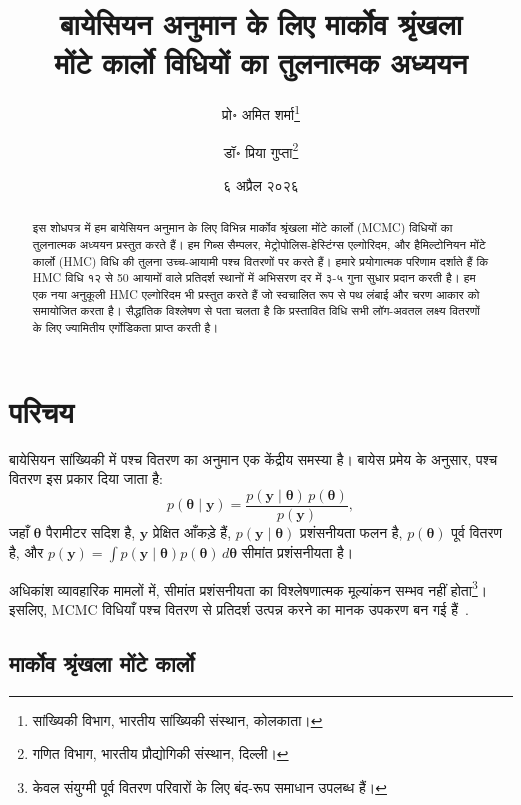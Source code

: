 \documentclass[12pt,a4paper]{article}
\title{बायेसियन अनुमान के लिए मार्कोव श्रृंखला\\
मोंटे कार्लो विधियों का तुलनात्मक अध्ययन}
\author{%
  प्रो॰ अमित शर्मा\thanks{सांख्यिकी विभाग, भारतीय सांख्यिकी संस्थान, कोलकाता।}
  \and
  डॉ॰ प्रिया गुप्ता\thanks{गणित विभाग, भारतीय प्रौद्योगिकी संस्थान, दिल्ली।}
}
\date{६ अप्रैल २०२६}
\theoremstyle{plain}
\theoremstyle{definition}
\theoremstyle{remark}
\begin{document}
\maketitle

\begin{abstract}
इस शोधपत्र में हम बायेसियन अनुमान के लिए विभिन्न मार्कोव श्रृंखला
मोंटे कार्लो (MCMC) विधियों का तुलनात्मक अध्ययन प्रस्तुत करते हैं।
हम गिब्स सैम्पलर, मेट्रोपोलिस-हेस्टिंग्स एल्गोरिदम, और हैमिल्टोनियन
मोंटे कार्लो (HMC) विधि की तुलना उच्च-आयामी पश्च वितरणों पर करते हैं।
हमारे प्रयोगात्मक परिणाम दर्शाते हैं कि HMC विधि १२ से 50 आयामों वाले
प्रतिदर्श स्थानों में अभिसरण दर में ३-५ गुना सुधार प्रदान करती है।
हम एक नया अनुकूली HMC एल्गोरिदम भी प्रस्तुत करते हैं जो स्वचालित रूप
से पथ लंबाई और चरण आकार को समायोजित करता है। सैद्धांतिक विश्लेषण
से पता चलता है कि प्रस्तावित विधि सभी लॉग-अवतल लक्ष्य वितरणों के लिए
ज्यामितीय एर्गोडिकता प्राप्त करती है।
\end{abstract}

\tableofcontents

\section{परिचय}
\label{sec:intro}

बायेसियन सांख्यिकी में पश्च वितरण का अनुमान एक केंद्रीय समस्या है।
बायेस प्रमेय के अनुसार, पश्च वितरण इस प्रकार दिया जाता है:
\begin{equation}
\label{eq:bayes}
p(\bm{\theta} \mid \mathbf{y}) = \frac{p(\mathbf{y} \mid \bm{\theta}) \, p(\bm{\theta})}{p(\mathbf{y})},
\end{equation}
जहाँ $\bm{\theta}$ पैरामीटर सदिश है, $\mathbf{y}$ प्रेक्षित आँकड़े हैं,
$p(\mathbf{y} \mid \bm{\theta})$ प्रशंसनीयता फलन है, $p(\bm{\theta})$ पूर्व
वितरण है, और $p(\mathbf{y}) = \int p(\mathbf{y} \mid \bm{\theta}) p(\bm{\theta}) \, d\bm{\theta}$
सीमांत प्रशंसनीयता है।

अधिकांश व्यावहारिक मामलों में, सीमांत प्रशंसनीयता का विश्लेषणात्मक
मूल्यांकन सम्‍भव नहीं होता\footnote{केवल संयुग्मी पूर्व वितरण परिवारों
के लिए बंद-रूप समाधान उपलब्ध हैं।}। इसलिए, MCMC विधियाँ पश्च
वितरण से प्रतिदर्श उत्पन्न करने का मानक उपकरण बन गई हैं~\citep{gelman2013}.

\subsection{मार्कोव श्रृंखला मोंटे कार्लो}
\end{document}

